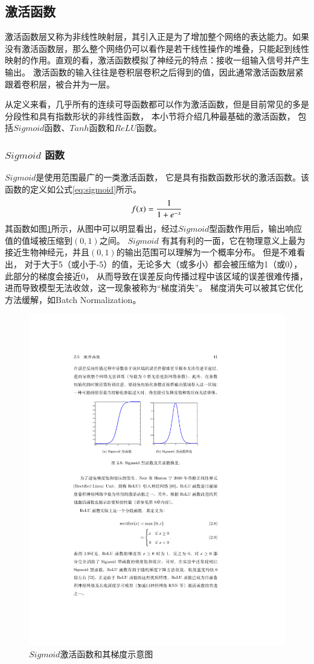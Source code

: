 \subsection{激活函数}

激活函数层又称为非线性映射层，其引入正是为了增加整个网络的表达能力。如果没有激活函数层，那么整个网络仍可以看作是若干线性操作的堆叠，只能起到线性映射的作用。直观的看，激活函数模拟了神经元的特点：接收一组输入信号并产生输出。
激活函数的输入往往是卷积层卷积之后得到的值，因此通常激活函数层紧跟着卷积层，被合并为一层。

从定义来看，几乎所有的连续可导函数都可以作为激活函数，但是目前常见的多是分段性和具有指数形状的非线性函数，
本小节将介绍几种最基础的激活函数，
包括$Sigmoid$\cite{魏秀参解析卷积神经网络}函数、$Tanh$\cite{魏秀参解析卷积神经网络}函数和$ReLU$\cite{魏秀参解析卷积神经网络}函数。

\subsubsection{$Sigmoid$ 函数}

$Sigmoid$是使用范围最广的一类激活函数，
它是具有指数函数形状的激活函数。该函数的定义如公式\eqref{eq:sigmoid}所示。
\begin{equation}
\centering
f(x)=\frac{1}{1+e^{-x}}
\label{eq:sigmoid}
\end{equation}
其函数如图\ref{fig:Sigmoid}所示，从图中可以明显看出，经过$Sigmoid$型函数作用后，输出响应值的值域被压缩到$(0,1)$之间。
$Sigmoid$ 有其有利的一面，它在物理意义上最为接近生物神经元，并且$(0,1)$的输出范围可以理解为一个概率分布。
但是不难看出，
对于大于5（或小于-5）的值，无论多大（或多小）都会被压缩为1（或0），此部分的梯度会接近0，
从而导致在误差反向传播过程中该区域的误差很难传播，进而导致模型无法收敛，这一现象被称为“梯度消失”。
梯度消失可以被其它优化方法缓解，如Batch Normalization\cite{ioffe2015batch}。
\begin{figure}[htbp]
\centering
\includegraphics[width=0.7\linewidth]{figures/sigmoid.pdf} 
\caption{$Sigmoid$激活函数和其梯度示意图}
\label{fig:Sigmoid}
\end{figure} 

